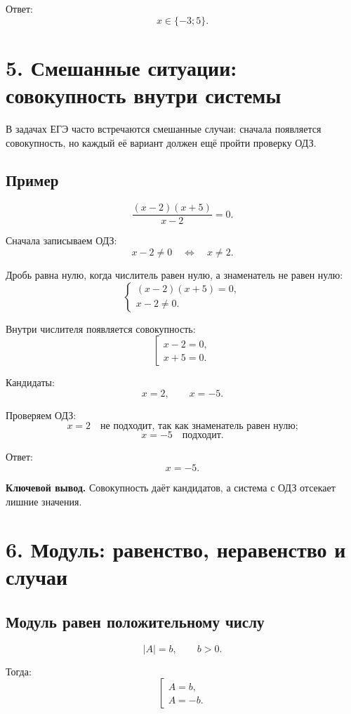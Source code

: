 \documentclass[a4paper,12pt]{article}
\newcommand{\important}[1]{\textcolor{darkaccent}{\textbf{#1}}}
\begin{document}
Ответ:
\[
\boxed{x\in\{-3;5\}}.
\]

\section*{5. Смешанные ситуации: совокупность внутри системы}

В задачах ЕГЭ часто встречаются смешанные случаи: сначала появляется совокупность, но каждый её вариант должен ещё пройти проверку ОДЗ.

\subsection*{Пример}

\[
\frac{(x-2)(x+5)}{x-2}=0.
\]

Сначала записываем ОДЗ:
\[
x-2\ne0
\quad\Longleftrightarrow\quad
x\ne2.
\]

Дробь равна нулю, когда числитель равен нулю, а знаменатель не равен нулю:
\[
\begin{cases}
(x-2)(x+5)=0,\\
x-2\ne0.
\end{cases}
\]

Внутри числителя появляется совокупность:
\[
\left[
\begin{array}{l}
x-2=0,\\
x+5=0.
\end{array}
\right.
\]

Кандидаты:
\[
x=2,\qquad x=-5.
\]

Проверяем ОДЗ:
\[
x=2 \quad \text{не подходит, так как знаменатель равен нулю;}
\]
\[
x=-5 \quad \text{подходит.}
\]

Ответ:
\[
\boxed{x=-5}.
\]

\important{Ключевой вывод.} Совокупность даёт кандидатов, а система с ОДЗ отсекает лишние значения.

\section*{6. Модуль: равенство, неравенство и случаи}

\subsection*{Модуль равен положительному числу}

\[
|A|=b,\qquad b>0.
\]

Тогда:
\[
\left[
\begin{array}{l}
A=b,\\
A=-b.
\end{array}
\right.
\]
\end{document}
